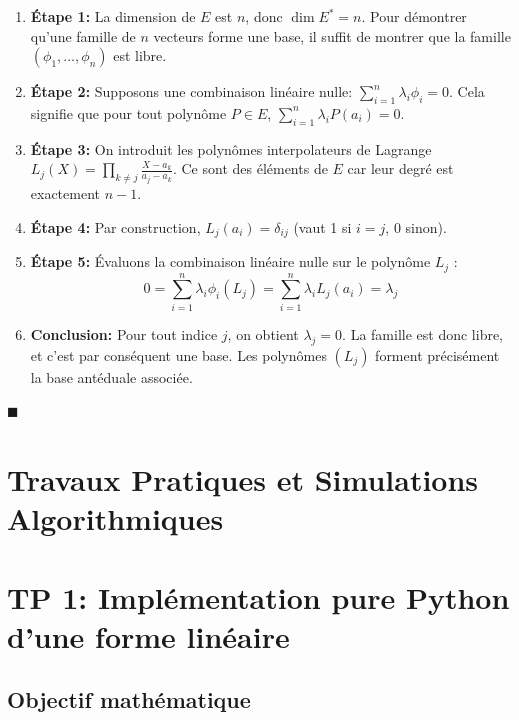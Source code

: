 \begin{enumerate}
\def\labelenumi{\arabic{enumi}.}
\tightlist
\item
  \textbf{Étape 1:} La dimension de \(E\) est \(n\), donc
  \(\dim E^* = n\). Pour démontrer qu'une famille de \(n\) vecteurs
  forme une base, il suffit de montrer que la famille
  \((\phi_1, \dots, \phi_n)\) est libre.
\item
  \textbf{Étape 2:} Supposons une combinaison linéaire nulle:
  \(\sum_{i=1}^n \lambda_i \phi_i = 0\). Cela signifie que pour tout
  polynôme \(P \in E\), \(\sum_{i=1}^n \lambda_i P(a_i) = 0\).
\item
  \textbf{Étape 3:} On introduit les polynômes interpolateurs de
  Lagrange \(L_j(X) = \prod_{k \neq j} \frac{X-a_k}{a_j-a_k}\). Ce sont
  des éléments de \(E\) car leur degré est exactement \(n-1\).
\item
  \textbf{Étape 4:} Par construction, \(L_j(a_i) = \delta_{ij}\) (vaut 1
  si \(i=j\), 0 sinon).
\item
  \textbf{Étape 5:} Évaluons la combinaison linéaire nulle sur le
  polynôme \(L_j\) :
  \[0 = \sum_{i=1}^n \lambda_i \phi_i(L_j) = \sum_{i=1}^n \lambda_i L_j(a_i) = \lambda_j\]
\item
  \textbf{Conclusion:} Pour tout indice \(j\), on obtient
  \(\lambda_j = 0\). La famille est donc libre, et c'est par conséquent
  une base. Les polynômes \((L_j)\) forment précisément la base
  antéduale associée.
\end{enumerate}

\(\blacksquare\)

\hypertarget{travaux-pratiques-et-simulations-algorithmiques}{%
\section{Travaux Pratiques et Simulations
Algorithmiques}\label{travaux-pratiques-et-simulations-algorithmiques}}

\hypertarget{tp-1-impluxe9mentation-pure-python-dune-forme-linuxe9aire}{%
\section{TP 1: Implémentation pure Python d'une forme
linéaire}\label{tp-1-impluxe9mentation-pure-python-dune-forme-linuxe9aire}}

\hypertarget{objectif-mathuxe9matique}{%
\subsection{Objectif mathématique}\label{objectif-mathuxe9matique}}

